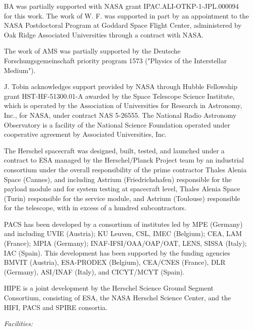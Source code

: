 \documentclass[manuscript]{aastex61}
\begin{document}
\acknowledgments
\par
BA was partially supported with NASA grant IPAC.ALI-OTKP-1-JPL.000094 for this work.  The work of W. F. was supported in part by an appointment to the NASA Postdoctoral Program at Goddard Space Flight Center, administered by Oak Ridge Associated Universities through a contract with NASA.
\par
The work of AMS was partially supported by the Deutsche Forschungsgemeinschaft priority program 1573 ("Physics of the Interstellar Medium").
\par
J. Tobin acknowledges support provided by NASA through Hubble Fellowship grant HST-HF-51300.01-A awarded by the Space Telescope Science Institute, which is operated by the Association of Universities for Research in Astronomy, Inc., for NASA, under contract NAS 5-26555. The National Radio Astronomy Observatory is a facility of the National Science Foundation operated under cooperative agreement by Associated Universities, Inc.
\par
The Herschel spacecraft was designed, built, tested, and launched under a contract to ESA managed by the Herschel/Planck Project team by an industrial consortium under the overall responsibility of the prime contractor Thales Alenia Space (Cannes), and including Astrium (Friedrichshafen) responsible for the payload module and for system testing at spacecraft level, Thales Alenia Space (Turin) responsible for the service module, and Astrium (Toulouse) responsible for the telescope, with in excess of a hundred subcontractors.
\par
PACS has been developed by a consortium of institutes led by MPE (Germany) and including UVIE (Austria); KU Leuven, CSL, IMEC (Belgium); CEA, LAM (France); MPIA (Germany); INAF-IFSI/OAA/OAP/OAT, LENS, SISSA (Italy); IAC (Spain). This development has been supported by the funding agencies BMVIT (Austria), ESA-PRODEX (Belgium), CEA/CNES (France), DLR (Germany), ASI/INAF (Italy), and CICYT/MCYT (Spain).
\par
HIPE is a joint development by the Herschel Science Ground Segment Consortium, consisting of ESA, the NASA Herschel Science Center, and the HIFI, PACS and SPIRE consortia.

{\it Facilities:} 

\clearpage
\end{document}
